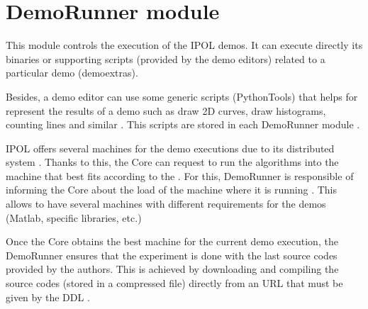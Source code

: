 
\section{DemoRunner module}
\label{sec:DemoRunner}

This module controls the execution of the IPOL demos. It can execute directly its  binaries or supporting scripts (provided by the demo editors) related to a particular demo (demoextras). 


Besides, a demo editor can use some generic scripts (PythonTools) that helps for  represent the results of a demo such as draw 2D curves, draw histograms, counting lines and similar .  This  scripts are stored in  each DemoRunner module . 

IPOL offers several machines for the demo executions due to its distributed system . Thanks to this, the Core can request to run the algorithms into  the machine that best fits according to the  . For this, DemoRunner is responsible of informing the Core about the load of the machine where it is running . This allows to have several machines with different requirements for the demos (Matlab, specific libraries, etc.) 

Once the Core obtains the best machine for the current demo execution, the DemoRunner ensures that the experiment is done with the last source codes provided by the authors. This is achieved by downloading and compiling the source codes  (stored in a compressed file) directly from an URL that must be given by the DDL .

